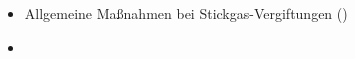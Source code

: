 \label{m:intoxikation-kohlenmonoxid}
\begin{itemize}
    \item Allgemeine Maßnahmen bei
Stickgas-Vergiftungen
()
\item {}
\end{itemize}